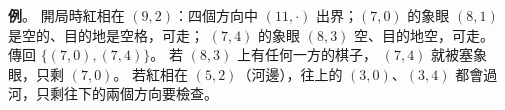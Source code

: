 \begin{pastsoln}
\textbf{例}。 開局時紅相在 $(9, 2)$：四個方向中 $(11, \cdot)$ 出界；$(7, 0)$ 的象眼 $(8, 1)$ 是空的、目的地是空格，可走；
$(7, 4)$ 的象眼 $(8, 3)$ 空、目的地空，可走。 傳回 $\{(7, 0), (7, 4)\}$。 若 $(8, 3)$ 上有任何一方的棋子，
$(7, 4)$ 就被塞象眼，只剩 $(7, 0)$。 若紅相在 $(5, 2)$（河邊），往上的 $(3, 0)$、$(3, 4)$ 都會過河，只剩往下的兩個方向要檢查。
\end{pastsoln}
